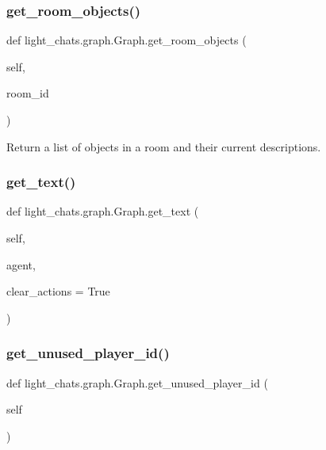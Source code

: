 \subsubsection{\texorpdfstring{get\+\_\+room\+\_\+objects()}{get\_room\_objects()}}
{\footnotesize\ttfamily def light\+\_\+chats.\+graph.\+Graph.\+get\+\_\+room\+\_\+objects (\begin{DoxyParamCaption}\item[{}]{self,  }\item[{}]{room\+\_\+id }\end{DoxyParamCaption})}

\begin{DoxyVerb}Return a list of objects in a room and their current descriptions.
\end{DoxyVerb}
 \mbox{\label{classlight__chats_1_1graph_1_1Graph_a63268fea99420b5cb83436499cd0676b}} 
\subsubsection{\texorpdfstring{get\+\_\+text()}{get\_text()}}
{\footnotesize\ttfamily def light\+\_\+chats.\+graph.\+Graph.\+get\+\_\+text (\begin{DoxyParamCaption}\item[{}]{self,  }\item[{}]{agent,  }\item[{}]{clear\+\_\+actions = {\ttfamily True} }\end{DoxyParamCaption})}

\mbox{\label{classlight__chats_1_1graph_1_1Graph_a89bb38305c3d42c4ce2ae8dcc966ab6e}} 
\subsubsection{\texorpdfstring{get\+\_\+unused\+\_\+player\+\_\+id()}{get\_unused\_player\_id()}}
{\footnotesize\ttfamily def light\+\_\+chats.\+graph.\+Graph.\+get\+\_\+unused\+\_\+player\+\_\+id (\begin{DoxyParamCaption}\item[{}]{self }\end{DoxyParamCaption})}

